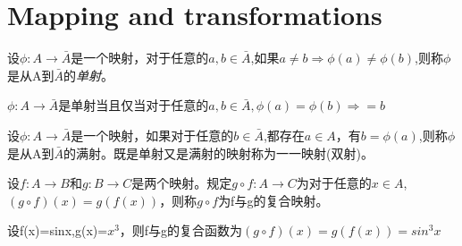 \documentclass[
	11pt, %
	fleqn, %
	a4paper, %
]{LegrandOrangeBook}
\begin{document}
\section{Mapping and transformations}
\begin{theorem}
	设$\phi:A\rightarrow\bar{A}$是一个映射，对于任意的$a,b\in \bar{A}$,如果$a\not=b\Rightarrow\phi(a)\not=\phi(b)$,则称$\phi$是从A到$\bar{A}$的\emph{单射}。
\end{theorem}

\begin{theorem}
	$\phi:A\rightarrow\bar{A}$是单射当且仅当对于任意的$a,b\in\bar{A},\phi(a)=\phi(b)\Rightarrow=b$
\end{theorem}

\begin{theorem}
	设$\phi:A\rightarrow\bar{A}$是一个映射，如果对于任意的$b\in\bar{A}$,都存在$a\in A$，有$b=\phi(a)$,则称$\phi$是从A到$\bar{A}$的满射。既是单射又是满射的映射称为一一映射(双射)。
\end{theorem}

\begin{theorem}
	设$f:A\rightarrow B$和$g:B\rightarrow C$是两个映射。规定$g\circ f:A\rightarrow C$为对于任意的$x\in A$,$(g\circ f)(x)=g(f(x))$，则称$g\circ f$为f与g的复合映射。
\end{theorem}

\begin{example}
	设f(x)=sinx,g(x)=$x^3$，则f与g的复合函数为$(g\circ f)(x)=g(f(x))=sin^3x$
\end{example}
\end{document}
